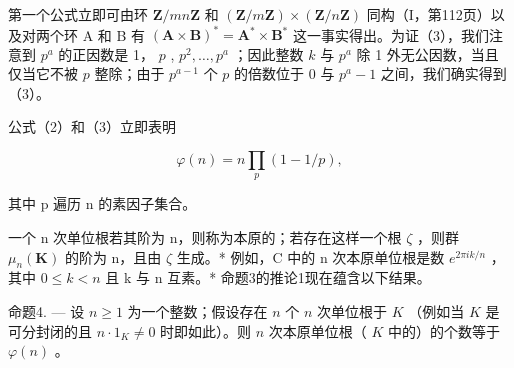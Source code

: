 第一个公式立即可由环 \(\mathbf{Z} / mn\mathbf{Z}\) 和 \((\mathbf{Z} / m\mathbf{Z}) \times (\mathbf{Z} / n\mathbf{Z})\) 同构（I，第112页）以及对两个环 A 和 B 有 \((\mathbf{A} \times \mathbf{B})^{*} = \mathbf{A}^{*} \times \mathbf{B}^{*}\) 这一事实得出。为证（3），我们注意到 \(p^{a}\) 的正因数是 1， \(p\) , \(p^{2}, \ldots, p^{a}\) ；因此整数 \(k\) 与 \(p^{a}\) 除 1 外无公因数，当且仅当它不被 \(p\) 整除；由于 \(p^{a-1}\) 个 \(p\) 的倍数位于 0 与 \(p^{a}-1\) 之间，我们确实得到（3）。

公式（2）和（3）立即表明

\[
\varphi (n) = n \prod_ {p} (1 - 1 / p),\tag{4}
\]

其中 p 遍历 n 的素因子集合。

一个 n 次单位根若其阶为 n，则称为本原的；若存在这样一个根 \(\zeta\) ，则群 \(\mu_{n}(\mathbf{K})\) 的阶为 n，且由 \(\zeta\) 生成。* 例如，C 中的 n 次本原单位根是数 \(e^{2\pi ik/n}\) ，其中 \(0 \leqslant k < n\) 且 k 与 n 互素。* 命题3的推论1现在蕴含以下结果。

命题4. --- 设 \(n \geqslant 1\) 为一个整数；假设存在 \(n\) 个 \(n\) 次单位根于 \(K\) （例如当 \(K\) 是可分封闭的且 \(n \cdot 1_{K} \neq 0\) 时即如此）。则 \(n\) 次本原单位根（ \(K\) 中的）的个数等于 \(\varphi(n)\) 。

